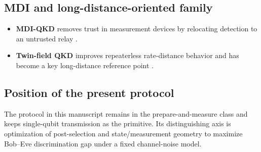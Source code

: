 \documentclass[a4paper,twocolumn,11pt,unpublished]{quantumarticle}
\begin{document}
\subsection{MDI and long-distance-oriented family}
\begin{itemize}
    \item \textbf{MDI-QKD} removes trust in measurement devices by relocating
    detection to an untrusted relay \cite{LoCurtyQi2012}.
    \item \textbf{Twin-field QKD} improves repeaterless rate-distance behavior
    and has become a key long-distance reference point \cite{rate_distance}.
\end{itemize}

\subsection{Position of the present protocol}
The protocol in this manuscript remains in the prepare-and-measure class and
keeps single-qubit transmission as the primitive. Its distinguishing axis is
optimization of post-selection and state/measurement geometry to maximize
Bob--Eve discrimination gap under a fixed channel-noise model.
\end{document}
